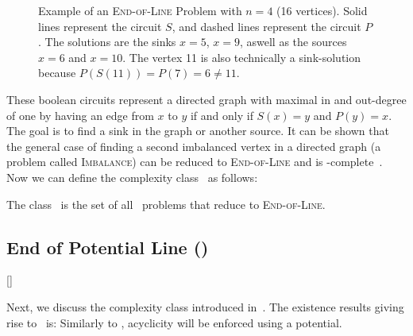 
\begin{figure}[ht]
	\centering
	\caption[Example of an \textsc{End-of-Line} Problem]{Example of an \textsc{End-of-Line} Problem with $n=4$ (16 vertices). Solid lines represent the circuit $S$, and dashed lines represent the circuit $P$. The solutions are the sinks $x=5$, $x=9$, aswell as the sources $x=6$ and $x=10$. The vertex 11 is also technically a sink-solution because $P(S(11)) = P(7) = 6 \neq 11$.}\label{fig:ppad_example}
\end{figure}

These boolean circuits represent a directed graph with maximal in and out-degree of one by having an edge from $x$ to $y$ if and only if $S(x) = y$ and $P(y) =
	x$.
The goal is to find a sink in the graph or another source.
It can be shown that the general case of finding a second imbalanced vertex in a directed graph (a problem called \textsc{Imbalance}) can be reduced to \textsc{End-of-Line} and is \PPAD-complete~. Now we can define the complexity class \PPAD\ as follows:

\begin{definition}[\PPAD]
	The class \PPAD\ is the set of all \TFNP\ problems that reduce to \textsc{End-of-Line}.
\end{definition}

\subsection{End of Potential Line (\EOPL)}[\EOPL]

Next, we discuss the complexity class \EOPL{} introduced in~. The existence results giving rise to \EOPL\ is:
Similarly to \PLS, acyclicity will be enforced using a potential.

